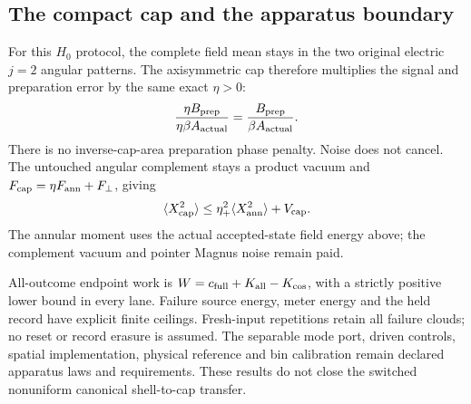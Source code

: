 \subsection{The compact cap and the apparatus boundary}
For this $H_0$ protocol, the complete field mean stays in the two original
electric $j=2$ angular patterns. The axisymmetric cap therefore multiplies
the signal and preparation error by the same exact $\eta>0$:
\begin{equation}
 \frac{\eta B_{\rm prep}}{\eta\beta A_{\rm actual}}
       =\frac{B_{\rm prep}}{\beta A_{\rm actual}}.
\end{equation}
There is no inverse-cap-area preparation phase penalty. Noise does not
cancel. The untouched angular complement stays a product vacuum and
$F_{\rm cap}=\eta F_{\rm ann}+F_\perp$, giving
\begin{equation}
 \langle X_{\rm cap}^2\rangle
 \leq\eta_+^2\langle X_{\rm ann}^2\rangle+V_{\rm cap}.
\end{equation}
The annular moment uses the actual accepted-state field energy above;
the complement vacuum and pointer Magnus noise remain paid.

All-outcome endpoint work is
$W=c_{\rm full}+K_{\rm all}-K_{\rm cos}$, with a strictly positive lower
bound in every lane. Failure source energy, meter energy and the held
record have explicit finite ceilings. Fresh-input repetitions retain all
failure clouds; no reset or record erasure is assumed. The separable mode
port, driven controls, spatial implementation, physical reference and bin
calibration remain declared apparatus laws and requirements. These results
do not close the switched nonuniform canonical shell-to-cap transfer.
